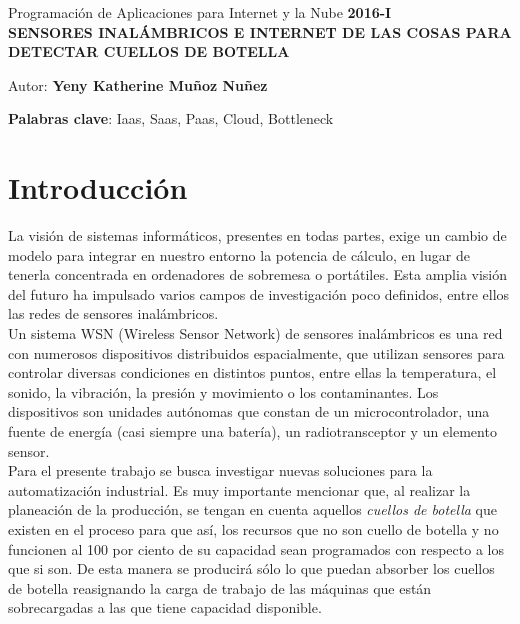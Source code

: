 \documentclass[10pt]{article}   			%
\begin{document}
	\renewcommand{\headrulewidth}{0.5pt}

	\thispagestyle{empty}						%
	\begin{center}
		\large {Programación de Aplicaciones para Internet y la Nube
			\hspace{5 cm}\textbf{2016-I}}
		\bigskip  
		\textbf{
			\LARGE{\\SENSORES INALÁMBRICOS E INTERNET DE LAS COSAS PARA DETECTAR CUELLOS DE BOTELLA}}\\								%
	\end{center}	
	\begin{flushright}	
		\bigskip	
		Autor: \textbf{Yeny Katherine Muñoz Nuñez}			%
	\end{flushright} 

	\textbf{Palabras clave}: Iaas, Saas, Paas, Cloud, Bottleneck		
	
\section{Introducción}

La visión de sistemas informáticos, presentes en todas partes, exige un cambio de modelo para integrar en nuestro entorno la potencia de cálculo, en lugar de tenerla concentrada en ordenadores de sobremesa o portátiles. Esta amplia visión del futuro ha impulsado varios campos de investigación poco definidos, entre ellos las redes de sensores inalámbricos.\\

Un sistema WSN (Wireless Sensor Network) de sensores inalámbricos es una red con numerosos dispositivos distribuidos espacialmente, que utilizan sensores para controlar diversas condiciones en distintos puntos, entre ellas la temperatura, el sonido, la vibración, la presión y movimiento o los contaminantes. Los dispositivos son unidades autónomas que constan de un microcontrolador, una fuente de energía (casi siempre una batería), un radiotransceptor y un elemento sensor.\\

Para el presente trabajo se busca investigar nuevas soluciones para la automatización industrial. Es muy importante mencionar que, al realizar la planeación de la producción, se tengan en cuenta aquellos \textit{cuellos de botella} que existen en el proceso para que así, los recursos que no son cuello de botella y no funcionen al 100 por ciento de su capacidad sean programados con respecto a los que si son. De esta manera se producirá sólo lo que puedan absorber los cuellos de botella reasignando la carga de trabajo de las máquinas que están sobrecargadas a las que tiene capacidad disponible.\\
\end{document}
